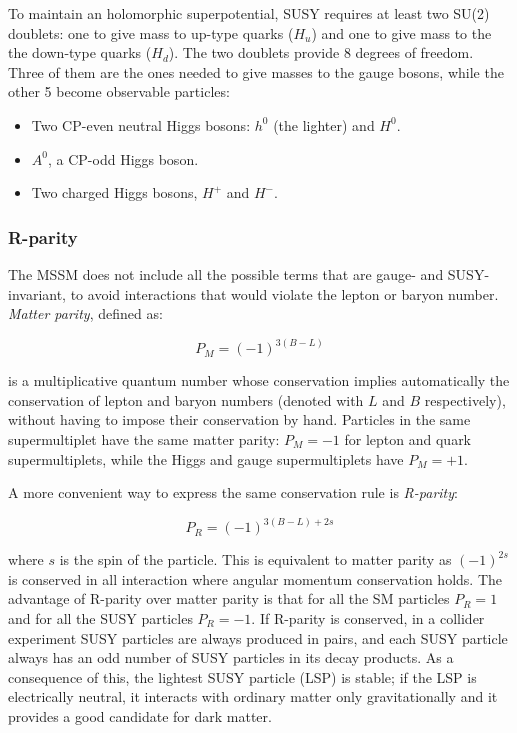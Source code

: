 To maintain an holomorphic superpotential, SUSY requires at least two SU(2) doublets: one to give mass to up-type quarks ($H_u$) and one to give mass to the the down-type quarks ($H_d$). The two doublets provide 8 degrees of freedom. Three of them are the ones needed to give masses to the gauge bosons, while the other 5 become observable particles:
\begin{itemize}
\item Two CP-even neutral Higgs bosons: $h^0$ (the lighter) and $H^0$.
\item $A^0$, a CP-odd Higgs boson.
\item Two charged Higgs bosons, $H^+$ and $H^-$.
\end{itemize}


\subsubsection{R-parity}

The MSSM does not include all the possible terms that are gauge- and SUSY-invariant, to avoid interactions that would violate the lepton or baryon number. \textit{Matter parity}, defined as:

\begin{equation}
P_M = (-1)^{3 (B-L)} 
\label{eq:defmatterparity}
\end{equation}

is a multiplicative quantum number whose conservation implies automatically the conservation of lepton and baryon numbers (denoted with $L$ and $B$ respectively), without having to impose their conservation by hand. Particles in the same supermultiplet have the same matter parity: $P_M =-1$ for lepton and quark supermultiplets, while the Higgs and gauge supermultiplets have $P_M =+1$.

A more convenient way to express the same conservation rule is \textit{R-parity}:

\begin{equation}
P_R = (-1)^{3(B-L) + 2 s}
\label{eq:defRparity}
\end{equation}

where $s$ is the spin of the particle. This is equivalent to matter parity as $(-1)^{2s}$ is conserved in all interaction where angular momentum conservation holds. The advantage of R-parity over matter parity is that for all the SM particles $P_R = 1$ and for all the SUSY particles $P_R=-1$. If  R-parity is conserved, in a collider experiment SUSY particles are always produced in pairs, and each SUSY particle always has an odd number of SUSY particles in its decay products. As a consequence of this, the lightest SUSY particle (LSP) is stable; if the LSP is electrically neutral, it interacts with ordinary matter only gravitationally and it provides a good candidate for dark matter.

